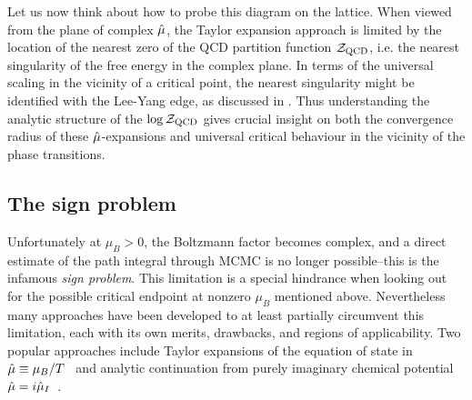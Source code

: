 Let us now think about how to probe this diagram on the lattice.
When viewed from the plane of complex $\hat{\mu}$, the Taylor expansion 
approach is limited by the location of the nearest zero of the QCD partition 
function $\mathcal{Z}_{\rm QCD}$, i.e. the nearest singularity of the free energy in the 
complex plane. In terms of the universal scaling in the vicinity of a critical 
point, the nearest singularity might be identified with the Lee-Yang 
edge, as discussed in . Thus understanding the analytic 
structure of the $\log\mathcal{Z}_{\rm QCD}$ gives crucial insight on both
the convergence radius of these $\hat{\mu}$-expansions and universal critical behaviour 
in the vicinity of the phase transitions.


\subsection{The sign problem}\label{sec:signProblem}


Unfortunately at $\mu_B>0$, the Boltzmann factor becomes complex, and a 
direct estimate of the path 
integral through MCMC is no longer possible--this is the infamous {\it sign problem}.
This limitation is a special hindrance when looking out for the possible critical 
endpoint at nonzero $\mu_B$ mentioned above. 
Nevertheless many approaches have been developed to at least partially circumvent this limitation, 
each with its own merits, drawbacks, and regions of applicability.
Two popular approaches include Taylor expansions of the equation of state in 
$\hat{\mu}\equiv\mu_B/T$~\cite{Allton:2002zi, Allton:2003vx, Gavai:2003mf} and analytic continuation 
from purely imaginary chemical potential  $\hat{\mu}=i\hat{\mu}_I$~\cite{deForcrand:2002hgr, DElia:2002tig}.


